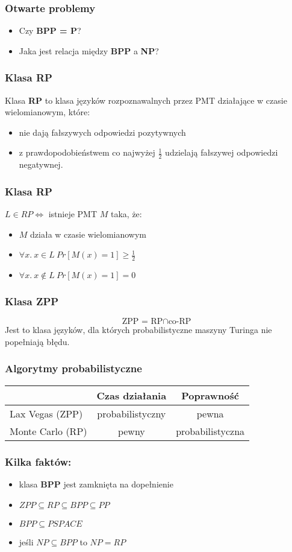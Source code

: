 \documentclass[compress]{beamer}
\begin{document}
\begin{frame}
\frametitle{Otwarte problemy}
\begin{itemize}
	\item Czy \textbf{BPP = P}?
	\item Jaka jest relacja między \textbf{BPP} a \textbf{NP}?
\end{itemize}
\end{frame}

\begin{frame}
\frametitle{Klasa RP}
\justifying
Klasa \textbf{RP} to klasa języków rozpoznawalnych przez PMT działające w czasie wielomianowym, które:
\begin{itemize}
	\item nie dają fałszywych odpowiedzi pozytywnych
	\item z prawdopodobieństwem co najwyżej \(\frac{1}{2}\) udzielają fałszywej odpowiedzi negatywnej.
\end{itemize}
\end{frame}

\begin{frame}
\frametitle{Klasa RP}
\justifying
\(L \in RP \Leftrightarrow \) istnieje PMT \(M\) taka, że:
\begin{itemize}
	\item \(M\) działa w czasie wielomianowym
	\item \(\forall x. ~ x \in L ~ Pr[M(x) = 1] \geq \frac{1}{2} \)
	\item \(\forall x. ~ x \notin L ~ Pr[M(x) = 1] = 0 \)
\end{itemize}
\end{frame}

\begin{frame}
\frametitle{Klasa ZPP}
\[\text{ZPP = RP} \cap \text{co-RP}\]
Jest to klasa języków, dla których probabilistyczne maszyny Turinga nie popełniają błędu.
\end{frame}

\begin{frame}
\frametitle{Algorytmy probabilistyczne}
\begin{table}
	\begin{tabular}{l | c | c}
	& Czas działania & Poprawność\\
	\hline \hline
	Lax Vegas (ZPP) & probabilistyczny & pewna \\
	\hline
	Monte Carlo (RP) & pewny & probabilistyczna
	\end{tabular}
\end{table}
\end{frame}

\begin{frame}
\frametitle{Kilka faktów:}
\begin{itemize}
	\item klasa \textbf{BPP} jest zamknięta na dopełnienie
	\item \(ZPP \subseteq RP \subseteq BPP \subseteq PP\)
	\item \(BPP \subseteq PSPACE\)
	\item jeśli \(NP \subseteq BPP\) to \(NP=RP\)
\end{itemize}
\end{frame}
\end{document}
